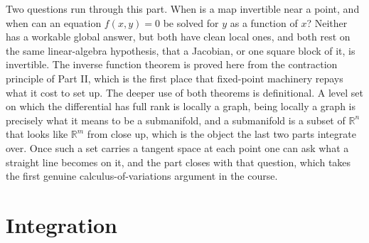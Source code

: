 \documentclass{report}
\theoremstyle{purplethm}
\theoremstyle{purplethm}
\theoremstyle{defthm}
\theoremstyle{examplethm}
\theoremstyle{questionthm}
\theoremstyle{remarkthm}
\theoremstyle{asidethm}
\theoremstyle{importantremarkthm}
\theoremstyle{remarkthm}
\theoremstyle{ainotethm}
\theoremstyle{purplethm}
\begin{document}
Two questions run through this part. When is a map invertible near a point, and when can an
equation $f(x,y) = 0$ be solved for $y$ as a function of $x$? Neither has a workable global
answer, but both have clean local ones, and both rest on the same linear-algebra hypothesis, that
a Jacobian, or one square block of it, is invertible. The inverse function theorem is proved here
from the contraction principle of Part II, which is the first place that fixed-point machinery
repays what it cost to set up. The deeper use of both theorems is definitional. A level set on
which the differential has full rank is locally a graph, being locally a graph is precisely what
it means to be a submanifold, and a submanifold is a subset of $\mathbb{R}^n$ that looks like
$\mathbb{R}^m$ from close up, which is the object the last two parts integrate over. Once such a
set carries a tangent space at each point one can ask what a straight line becomes on it, and the
part closes with that question, which takes the first genuine calculus-of-variations argument in
the course.






\part{Integration}
\end{document}
